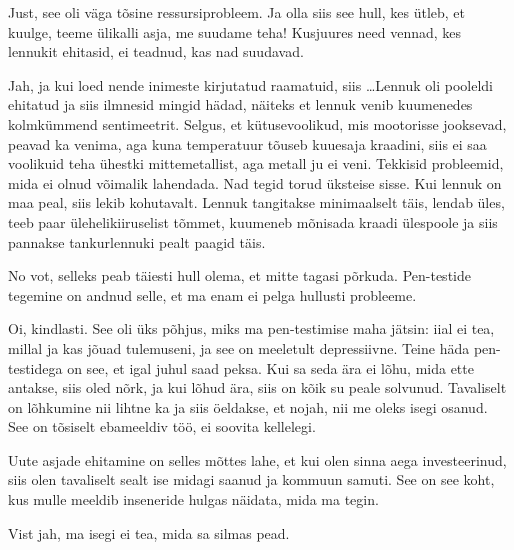 
Just, see oli väga tõsine ressursiprobleem. Ja olla siis see hull, kes ütleb, et 
kuulge, teeme ülikalli asja, me suudame teha! Kusjuures need 
vennad, kes lennukit ehitasid, ei teadnud, kas nad suudavad. 


Jah, ja kui loed nende inimeste kirjutatud raamatuid, 
siis \ldots Lennuk oli pooleldi ehitatud ja siis ilmnesid mingid hädad, näiteks 
et lennuk venib kuumenedes kolmkümmend sentimeetrit. Selgus, et kütusevoolikud, mis mootorisse jooksevad, 
peavad ka venima, aga kuna temperatuur tõuseb kuuesaja kraadini, 
siis ei saa voolikuid teha ühestki mittemetallist, aga metall ju ei veni. Tekkisid 
probleemid, mida ei olnud võimalik lahendada. Nad tegid torud 
üksteise sisse. Kui lennuk on maa peal, siis lekib kohutavalt. Lennuk 
tangitakse minimaalselt täis, lendab üles, teeb paar ülehelikiiruselist 
tõmmet, kuumeneb mõnisada kraadi ülespoole ja siis pannakse 
tankurlennuki pealt paagid täis. 


No vot, selleks peab täiesti hull olema, et mitte tagasi 
põrkuda. Pen-testide tegemine on andnud selle, et ma enam ei pelga hullusti 
probleeme. 


Oi, kindlasti. See oli üks 
põhjus, miks ma pen-testimise maha jätsin: iial ei tea, millal ja kas jõuad
tulemuseni, ja see on meeletult depressiivne. Teine häda pen-testidega on see, et igal juhul saad peksa. Kui sa seda ära ei lõhu, mida 
ette antakse, siis oled nõrk, ja kui lõhud ära, siis on kõik su peale 
solvunud. Tavaliselt on lõhkumine nii lihtne ka ja siis
öeldakse, et nojah, nii me oleks isegi osanud. See
on tõsiselt ebameeldiv töö, ei soovita kellelegi. 

Uute asjade ehitamine on selles mõttes lahe, et kui olen sinna aega 
investeerinud, siis olen tavaliselt sealt ise midagi saanud ja 
kommuun samuti. See on see koht, kus mulle meeldib 
inseneride hulgas näidata, mida ma tegin. 


Vist jah, ma isegi ei tea, mida sa silmas pead. 


